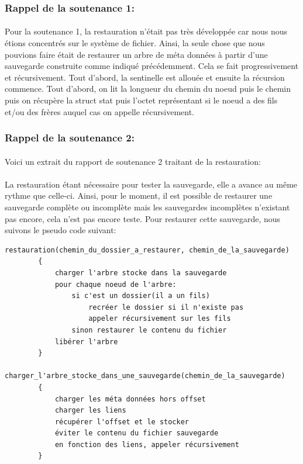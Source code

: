         \subsubsection{Rappel de la soutenance 1:}
            \paragraph*{}
            Pour la soutenance 1, la restauration n'était pas très développée car nous nous étions concentrés sur le système de fichier. Ainsi, la seule chose que nous pouvions faire était de restaurer un arbre de méta données à partir d'une sauvegarde construite comme indiqué précédemment. Cela se fait progressivement et récursivement. Tout d'abord, la sentinelle est allouée et ensuite la récursion commence. Tout d'abord, on lit la longueur du chemin du noeud puis le chemin puis on récupère la struct stat puis l'octet représentant si le noeud a des fils et/ou des frères auquel cas on appelle récursivement.
        \subsubsection{Rappel de la soutenance 2:}
            \paragraph*{}
            Voici un extrait du rapport de soutenance 2 traitant de la restauration:
            \paragraph*{}
            La restauration étant nécessaire pour tester la sauvegarde, elle a avance au même rythme que celle-ci. Ainsi, pour le moment, il est possible de restaurer une sauvegarde complète ou incomplète mais les sauvegardes incomplètes n'existant pas encore, cela n'est pas encore teste. Pour restaurer cette sauvegarde, nous suivons le pseudo code suivant:
        \begin{lstlisting}[style=CStyle]
        restauration(chemin_du_dossier_a_restaurer, chemin_de_la_sauvegarde)
        {
            charger l'arbre stocke dans la sauvegarde
            pour chaque noeud de l'arbre:
                si c'est un dossier(il a un fils)
                    recréer le dossier si il n'existe pas
                    appeler récursivement sur les fils
                sinon restaurer le contenu du fichier
            libérer l'arbre
        }
        charger_l'arbre_stocke_dans_une_sauvegarde(chemin_de_la_sauvegarde)
        {
            charger les méta données hors offset
            charger les liens
            récupérer l'offset et le stocker
            éviter le contenu du fichier sauvegarde
            en fonction des liens, appeler récursivement
        }        \end{lstlisting}
            
